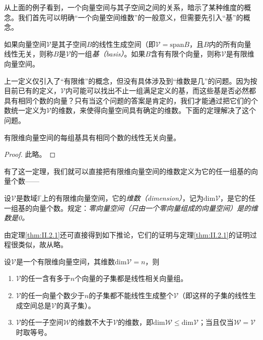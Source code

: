 \documentclass[../main.tex]{subfiles}
\begin{document}
从上面的例子看到，一个向量空间与其子空间之间的关系，暗示了某种维度的概念。我们首先可以明确“一个向量空间维数”的一般意义，但需要先引入“基”的概念。

\begin{definition}[向量空间的基]\label{def:II.2.5}\cite[\S 7.2定义2.4]{周胜林2012线性代数}
    如果向量空间$\mathcal{V}$是其子空间$B$的线性生成空间（即$\mathcal{V}=\mathrm{span}B$，且$B$内的所有向量线性无关，则称$B$是$\mathcal{V}$的一组\emph{基（basis）}。如果$B$含有有限个向量，则称$\mathcal{V}$是有限维向量空间。
\end{definition}

上一定义仅引入了“有限维”的概念，但没有具体涉及到“维数是几”的问题。因为按目前已有的定义，$\mathcal{V}$内可能可以找出不止一组满足定义的基，而这些基是否必然都具有相同个数的向量？只有当这个问题的答案是肯定的，我们才能通过把它们的个数统一定义为$\mathcal{V}$的维数，来使得向量空间具有确定的维数。下面的定理解决了这个问题。

\begin{theorem}\label{thm:II.2.1}
    有限维向量空间的每组基具有相同个数的线性无关向量。
\end{theorem}
\begin{proof}
    此略\cite[“(3)的证明”，p.~171]{周胜林2012线性代数}\cite[\S 2.3,Theorem 4,p.~44]{Hoffman1971}。
\end{proof}

有了这一定理，我们就可以直接把有限维向量空间的维数定义为它的任一组基的向量个数——

\begin{definition}[有限维向量空间的维数]\label{def:II.2.6}
    设$\mathcal{V}$是数域$\mathbb{F}$上的有限维向量空间，它的\emph{维数（dimension）}，记为$\mathrm{dim}\mathcal{V}$，是它的任一组基的向量个数。规定：\emph{零向量空间（只由一个零向量组成的向量空间）是的维数是0。}
\end{definition}

由定理\ref{thm:II.2.1}还可直接得到如下推论，它们的证明与定理\ref{thm:II.2.1}的证明过程很类似，故从略。

\begin{corollary}
    设$\mathcal{V}$是一个有限维向量空间，其维数$\mathrm{dim}\mathcal{V}=n$，则
    \begin{enumerate}
        \item $\mathcal{V}$的任一含有多于$n$个向量的子集都是线性相关向量组。
        \item $\mathcal{V}$的任一向量个数少于$n$的子集都不能线性生成整个$\mathcal{V}$（即这样的子集的线性生成空间总是$\mathcal{V}$的真子集）。
        \item $\mathcal{V}$的任一子空间$\mathcal{W}$的维数不大于$\mathcal{V}$的维数，即$\mathrm{dim}\mathcal{W}\leq\mathrm{dim}\mathcal{V}$；当且仅当$\mathcal{W}=\mathcal{V}$时取等号。
    \end{enumerate}
\end{corollary}
\end{document}
